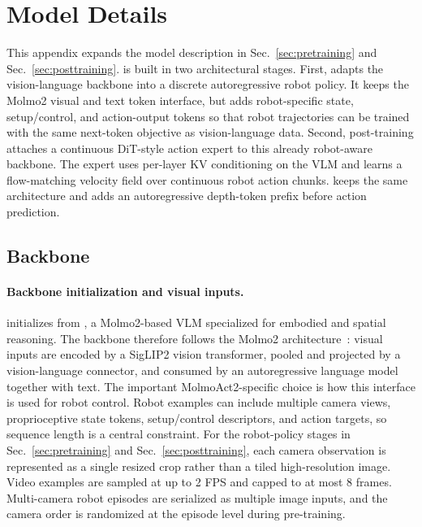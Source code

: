\section{Model Details}
\label{supp:model}

This appendix expands the model description in Sec.~\ref{sec:pretraining} and
Sec.~\ref{sec:posttraining}. \molmoactt is built in two architectural stages.
First, \molmoacttpre adapts the \molmoer vision-language backbone into a
discrete autoregressive robot policy. It keeps the Molmo2 visual and text token
interface, but adds robot-specific state, setup/control, and action-output
tokens so that robot trajectories can be trained with the same next-token
objective as vision-language data. Second, post-training attaches a continuous
DiT-style action expert to this already robot-aware backbone. The expert uses
per-layer KV conditioning on the VLM and learns a flow-matching velocity field
over continuous robot action chunks. \molmothink keeps the same architecture and
adds an autoregressive depth-token prefix before action prediction.

\subsection{\molmoactt Backbone}
\label{supp:model-backbone}

\paragraph{Backbone initialization and visual inputs.}
\molmoactt initializes from \molmoer, a Molmo2-based VLM specialized for
embodied and spatial reasoning. The backbone therefore follows the Molmo2
architecture~\citep{clark2026molmo2openweightsdata}: visual inputs are encoded
by a SigLIP2 vision transformer, pooled and projected by a vision-language
connector, and consumed by an autoregressive language model together with text.
The important MolmoAct2-specific choice is how this interface is used for robot
control. Robot examples can include multiple camera views, proprioceptive state
tokens, setup/control descriptors, and action targets, so sequence length is a
central constraint. For the robot-policy stages in Sec.~\ref{sec:pretraining}
and Sec.~\ref{sec:posttraining}, each camera observation is represented as a
single resized crop rather than a tiled high-resolution image. Video examples
are sampled at up to 2 FPS and capped to at most 8 frames. Multi-camera robot
episodes are serialized as multiple image inputs, and the camera order is
randomized at the episode level during pre-training.

